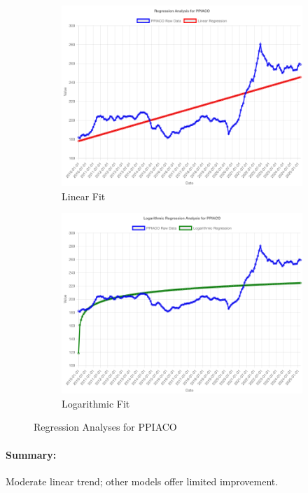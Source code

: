 \documentclass[11pt,a4paper]{article}
\begin{document}
\begin{figure}[htbp]
  \centering
  \begin{subfigure}[b]{0.48\textwidth}
    \includegraphics[width=\textwidth]{backend/analyses/PPIACO_analysis.png}
    \caption{Linear Fit}
  \end{subfigure}
  \hfill
  \begin{subfigure}[b]{0.48\textwidth}
    \includegraphics[width=\textwidth]{backend/analyses/PPIACO_log_analysis.png}
    \caption{Logarithmic Fit}
  \end{subfigure}
  \caption{Regression Analyses for PPIACO}
\end{figure}

\paragraph{Summary:}
Moderate linear trend; other models offer limited improvement.
\end{document}
